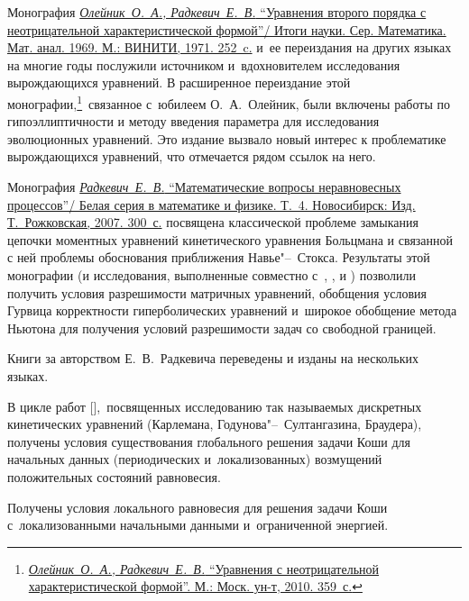 Монография \href{http://mi.mathnet.ru/intm17 }{{\it Олейник~О.~А., Радкевич~Е.~В.} ``Уравнения второго порядка с неотрицательной характеристической формой''/ Итоги науки. Сер. Математика. Мат. анал. 1969. М.: ВИНИТИ,  1971. 252~c.} и~ее переиздания на других языках на многие годы послужили  источником и~вдохновителем исследования вырождающихся уравнений. В расширенное переиздание этой монографии,\footnote{\href{https://elibrary.ru/item.asp?id=19461734}{{\it Олейник~О.~А., Радкевич~Е.~В.} ``Уравнения с неотрицательной характеристической формой''. М.: Моск. ун-т, 2010. 359~с.}}\!\!~связанное с~юбилеем О.~А.~Олейник, были включены работы по гипоэллиптичности и методу введения параметра для исследования эволюционных уравнений. Это издание вызвало новый интерес к проблематике вырождающихся уравнений, что отмечается рядом ссылок на него.



Монография \href{https://elibrary.ru/item.asp?id=19453018}{{\it Радкевич~Е.~В.} ``Математические вопросы неравновесных процессов''/ Белая серия в математике и физике. Т.~4. Новосибирск: Изд. Т.~Рожковская, 2007. 300~с.} посвящена классической проблеме замыкания цепочки моментных уравнений кинетического уравнения Больцмана и связанной с ней проблемы обоснования  приближения Навье"--~Стокса. Результаты этой монографии (и исследования, выполненные совместно с~, ,  и ) позволили получить условия разрешимости матричных уравнений, обобщения условия Гурвица корректности гиперболических уравнений и~широкое обобщение метода Ньютона для получения условий разрешимости задач со свободной границей.

Книги за авторством Е.~В.~Радкевича переведены и изданы на нескольких языках.







В цикле работ [],~посвященных исследованию так называемых дискретных кинетических уравнений (Карлемана, Годунова"--~Султангазина, Браудера), получены условия существования глобального решения задачи Коши для начальных данных  (периодических и~локализованных) возмущений положительных состояний равновесия. 



Получены условия локального равновесия для решения задачи Коши с~локализованными начальными данными и~ограниченной энергией. 

